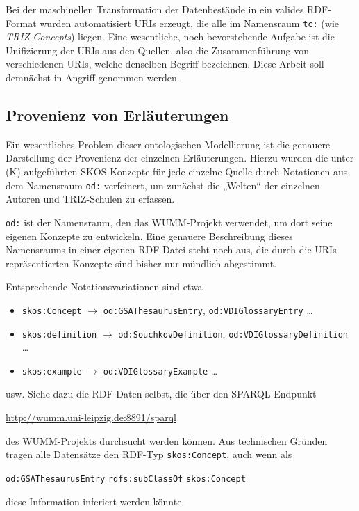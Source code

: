 \documentclass[11pt,a4paper]{article}
\begin{document}
Bei der maschinellen Transformation der Datenbestände in ein valides
RDF-Format wurden automatisiert URIs erzeugt, die alle im Namensraum
\texttt{tc:} (wie \emph{TRIZ Concepts}) liegen. Eine wesentliche, noch
bevorstehende Aufgabe ist die Unifizierung der URIs aus den Quellen, also die
Zusammenführung von verschiedenen URIs, welche denselben Begriff bezeichnen.
Diese Arbeit soll demnächst in Angriff genommen werden. 

\subsection{Provenienz von Erläuterungen}

Ein wesentliches Problem dieser ontologischen Modellierung ist die genauere
Darstellung der Provenienz der einzelnen Erläuterungen. Hierzu wurden die
unter (K) aufgeführten SKOS-Konzepte für jede einzelne Quelle durch Notationen
aus dem Namensraum \texttt{od:} verfeinert, um zunächst die „Welten“ der
einzelnen Autoren und TRIZ-Schulen zu erfassen.

\texttt{od:} ist der Namensraum, den das WUMM-Projekt verwendet, um dort seine
eigenen Konzepte zu entwickeln.  Eine genauere Beschreibung dieses Namensraums
in einer eigenen RDF-Datei steht noch aus, die durch die URIs repräsentierten
Konzepte sind bisher nur mündlich abgestimmt.

Entsprechende Notationsvariationen sind etwa
\begin{itemize}[noitemsep]
\item \texttt{skos:Concept} $\to$ \texttt{od:GSAThesaurusEntry},
  \texttt{od:VDIGlossaryEntry} \ldots
\item \texttt{skos:definition} $\to$ \texttt{od:SouchkovDefinition},
  \texttt{od:VDIGlossaryDefinition} \ldots
\item \texttt{skos:example} $\to$ \texttt{od:VDIGlossaryExample} \ldots
\end{itemize}
usw. Siehe dazu die RDF-Daten selbst, die über den SPARQL-Endpunkt
\begin{center}
  \url{http://wumm.uni-leipzig.de:8891/sparql}
\end{center}
des WUMM-Projekts durchsucht werden können. Aus technischen Gründen tragen
alle Datensätze den RDF-Typ \texttt{skos:Concept}, auch wenn als 
\begin{center}
  \texttt{od:GSAThesaurusEntry} \texttt{rdfs:subClassOf} \texttt{skos:Concept}
\end{center}
diese Information inferiert werden könnte. 
\end{document}
